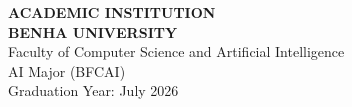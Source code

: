\begin{center}
\vspace{1cm}

\begin{tcolorbox}[
    colback=brandAccent!5,
    colframe=brandAccent,
    boxrule=1pt,
    arc=3pt,
    width=0.8\textwidth,
    halign=center
]
\textbf{ACADEMIC INSTITUTION}\\[0.5em]
\textbf{BENHA UNIVERSITY}\\
Faculty of Computer Science and Artificial Intelligence\\
AI Major (BFCAI)\\
Graduation Year: July 2026
\end{tcolorbox}

\end{center}

\clearpage
